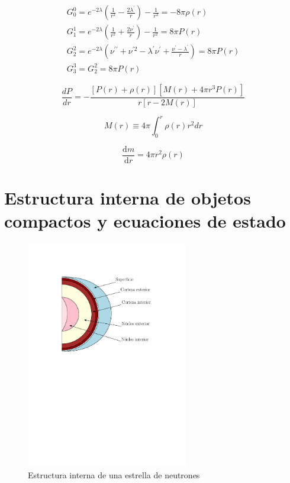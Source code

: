 \begin{equation}
    \begin{array} { l } { G _ { 0 } ^ { 0 } = e ^ { - 2 \lambda } \left( \frac { 1 } { r ^ { 2 } } - \frac { 2 \lambda ^ { \prime } } { r } \right) - \frac { 1 } { r ^ { 2 } } = - 8 \pi  \rho ( r ) } \\ { G _ { 1 } ^ { 1 } = e ^ { - 2 \lambda } \left( \frac { 1 } { r ^ { 2 } } + \frac { 2 \nu ^ { \prime } } { r } \right) - \frac { 1 } { r ^ { 2 } } = 8 \pi  P ( r ) } \\ { G _ { 2 } ^ { 2 } = e ^ { - 2 \lambda } \left( \nu ^ { \prime \prime } + \nu ^ { \prime 2 } - \lambda ^ { \prime } \nu ^ { \prime } + \frac { \nu ^ { \prime } - \lambda ^ { \prime } } { r } \right) = 8 \pi  P ( r ) } \\ { G _ { 3 } ^ { 3 } = G _ { 2 } ^ { 2 } = 8 \pi  P ( r ) } \end{array}
\end{equation}

\begin{equation}
    \frac { d P } { d r } = - \frac { [ P ( r ) + \rho ( r ) ] \left[ M ( r ) + 4 \pi r ^ { 3 } P ( r ) \right] } { r [ r - 2 M ( r ) ] }
\end{equation}

\begin{equation}
    M ( r ) \equiv 4 \pi \int _ { 0 } ^ { r } \rho ( r ) r ^ { 2 } d r
\end{equation}

\begin{equation}
    \frac { \mathrm { d } m } { \mathrm { d } r } = 4 \pi r ^ { 2 } \rho(r)
\end{equation}

\section{Estructura interna de objetos compactos y ecuaciones de estado}

\begin{figure}[H]
    \centering
    \includegraphics[width=200pt]{figures/neutronstar.pdf}
    \caption{Estructura interna de una estrella de neutrones}
    \label{NSS}
\end{figure}

